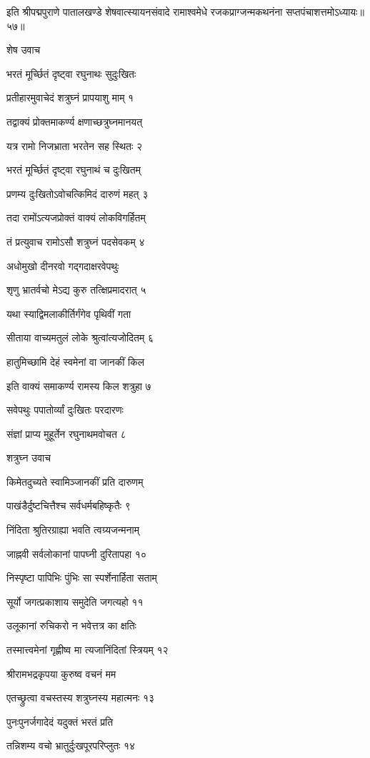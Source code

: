 इति श्रीपद्मपुराणे पातालखण्डे शेषवात्स्यायनसंवादे रामाश्वमेधे रजकप्राग्जन्मकथनंना सप्तपंचाशत्तमोऽध्यायः॥५७॥


शेष उवाच

भरतं मूर्च्छितं दृष्ट्वा रघुनाथः सुदुःखितः

प्रतीहारमुवाचेदं शत्रुघ्नं प्रापयाशु माम् १

तद्वाक्यं प्रोक्तमाकर्ण्य क्षणाच्छत्रुघ्नमानयत्

यत्र रामो निजभ्राता भरतेन सह स्थितः २

भरतं मूर्च्छितं दृष्ट्वा रघुनाथं च दुःखितम्

प्रणम्य दुःखितोऽवोचत्किमिदं दारुणं महत् ३

तदा रामोंऽत्यजप्रोक्तं वाक्यं लोकविगर्हितम्

तं प्रत्युवाच रामोऽसौ शत्रुघ्नं पदसेवकम् ४

अधोमुखो दीनरवो गद्गदाक्षरवेपथुः

शृणु भ्रातर्वचो मेऽद्य कुरु तत्क्षिप्रमादरात् ५

यथा स्याद्विमलाकीर्तिर्गंगेव पृथिवीं गता

सीताया वाच्यमतुलं लोके श्रुत्वांत्यजोदितम् ६

हातुमिच्छामि देहं स्वमेनां वा जानकीं किल

इति वाक्यं समाकर्ण्य रामस्य किल शत्रुहा ७

सवेपथुः पपातोर्व्यां दुःखितः परदारणः

संज्ञां प्राप्य मुहूर्तेन रघुनाथमवोचत ८

शत्रुघ्न उवाच

किमेतदुच्यते स्वामिञ्जानकीं प्रति दारुणम्

पाखंडैर्दुष्टचित्तैश्च सर्वधर्मबहिष्कृतैः ९

निंदिता श्रुतिरग्राह्या भवति त्वग्र्यजन्मनाम्

जाह्नवी सर्वलोकानां पापघ्नी दुरितापहा १०

निस्पृष्टा पापिभिः पुंभिः सा स्पर्शेनार्हिता सताम्

सूर्यो जगत्प्रकाशाय समुदेति जगत्यहो ११

उलूकानां रुचिकरो न भवेत्तत्र का क्षतिः

तस्मात्त्वमेनां गृह्णीष्व मा त्यजानिंदितां स्त्रियम् १२

श्रीरामभद्रकृपया कुरुष्व वचनं मम

एतच्छ्रुत्वा वचस्तस्य शत्रुघ्नस्य महात्मनः १३

पुनःपुनर्जगादेदं यदुक्तं भरतं प्रति

तन्निशम्य वचो भ्रातुर्दुःखपूरपरिप्लुतः १४

